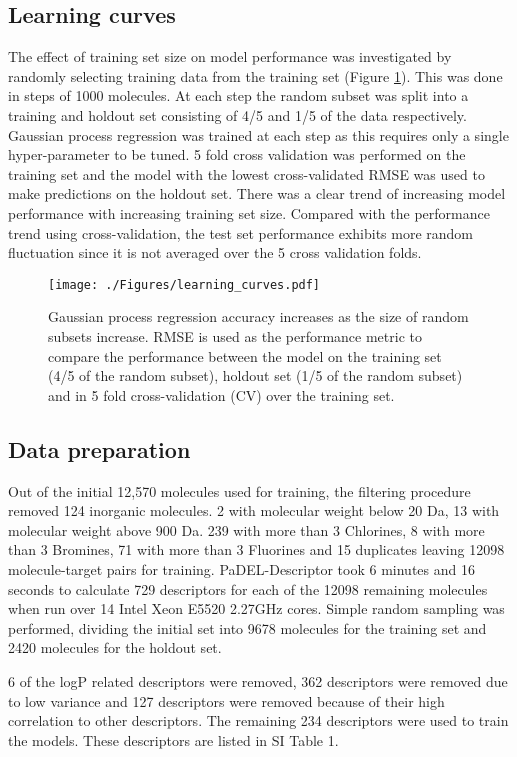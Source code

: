 \subsection*{Learning curves}
The effect of training set size on model performance was investigated by randomly selecting training data from the training set (Figure \ref{fig:learning_curves}). This was done in steps of 1000 molecules. At each step the random subset was split into a training and holdout set consisting of 4/5 and 1/5 of the data respectively. Gaussian process regression was trained at each step as this requires only a single hyper-parameter to be tuned. 5 fold cross validation was performed on the training set and the model with the lowest cross-validated RMSE was used to make predictions on the holdout set. There was a clear trend of increasing model performance with increasing training set size. Compared with the performance trend using cross-validation, the test set performance exhibits more random fluctuation since it is not averaged over the 5 cross validation folds.

\begin{figure}[ht]
  \centering
  \texttt{[image: ./Figures/learning\_curves.pdf]}
  \caption{Gaussian process regression accuracy increases as the size of random subsets increase. RMSE is used as the performance metric to compare the performance between the model on the training set (4/5 of the random subset), holdout set (1/5 of the random subset) and in 5 fold cross-validation (CV) over the training set.}
  \label{fig:learning_curves}
\end{figure} 

\subsection*{Data preparation}
Out of the initial 12,570 molecules used for training, the filtering procedure removed 124 inorganic molecules. 2 with molecular weight below 20 Da, 13 with molecular weight above 900 Da. 239 with more than 3 Chlorines, 8 with more than 3 Bromines, 71 with more than 3 Fluorines and 15 duplicates leaving 12098 molecule-target pairs for training. PaDEL-Descriptor took 6 minutes and 16 seconds to calculate 729 descriptors for each of the 12098 remaining molecules when run over 14 Intel Xeon E5520 2.27GHz cores. Simple random sampling was performed, dividing the initial set into 9678 molecules for the training set and 2420 molecules for the holdout set. 

6 of the logP related descriptors were removed, 362 descriptors were removed due to low variance and 127 descriptors were removed because of their high correlation to other descriptors. The remaining 234 descriptors were used to train the models. These descriptors are listed in SI Table 1.

